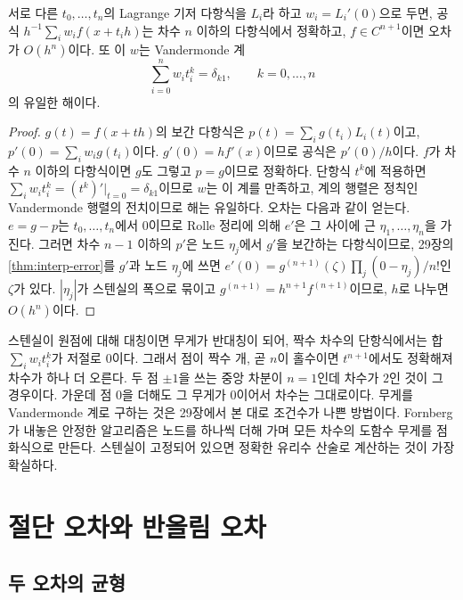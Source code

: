\begin{proposition}
\label{prop:fd-weights}
서로 다른 $t_0,\dots,t_n$의 Lagrange 기저 다항식을 $L_i$라 하고 $w_i=L_i'(0)$으로 두면, 공식 $h^{-1}\sum_iw_if(x+t_ih)$는 차수 $n$ 이하의 다항식에서 정확하고, $f\in C^{n+1}$이면 오차가 $O(h^n)$이다. 또 이 $w$는 Vandermonde 계
\[
\sum_{i=0}^nw_it_i^k=\delta_{k1},\qquad k=0,\dots,n
\]
의 유일한 해이다.
\end{proposition}

\begin{proof}
$g(t)=f(x+th)$의 보간 다항식은 $p(t)=\sum_ig(t_i)L_i(t)$이고, $p'(0)=\sum_iw_ig(t_i)$이다. $g'(0)=hf'(x)$이므로 공식은 $p'(0)/h$이다. $f$가 차수 $n$ 이하의 다항식이면 $g$도 그렇고 $p=g$이므로 정확하다. 단항식 $t^k$에 적용하면 $\sum_iw_it_i^k=(t^k)'\big|_{t=0}=\delta_{k1}$이므로 $w$는 이 계를 만족하고, 계의 행렬은 정칙인 Vandermonde 행렬의 전치이므로 해는 유일하다. 오차는 다음과 같이 얻는다. $e=g-p$는 $t_0,\dots,t_n$에서 $0$이므로 Rolle 정리에 의해 $e'$은 그 사이에 근 $\eta_1,\dots,\eta_n$을 가진다. 그러면 차수 $n-1$ 이하의 $p'$은 노드 $\eta_j$에서 $g'$을 보간하는 다항식이므로, 29장의 \cref{thm:interp-error}를 $g'$과 노드 $\eta_j$에 쓰면 $e'(0)=g^{(n+1)}(\zeta)\prod_j(0-\eta_j)/n!$인 $\zeta$가 있다. $|\eta_j|$가 스텐실의 폭으로 묶이고 $g^{(n+1)}=h^{n+1}f^{(n+1)}$이므로, $h$로 나누면 $O(h^n)$이다.
\end{proof}

스텐실이 원점에 대해 대칭이면 무게가 반대칭이 되어, 짝수 차수의 단항식에서는 합 $\sum_iw_it_i^k$가 저절로 $0$이다. 그래서 점이 짝수 개, 곧 $n$이 홀수이면 $t^{n+1}$에서도 정확해져 차수가 하나 더 오른다. 두 점 $\pm1$을 쓰는 중앙 차분이 $n=1$인데 차수가 $2$인 것이 그 경우이다. 가운데 점 $0$을 더해도 그 무게가 $0$이어서 차수는 그대로이다. 무게를 Vandermonde 계로 구하는 것은 29장에서 본 대로 조건수가 나쁜 방법이다. Fornberg가 내놓은 안정한 알고리즘은 노드를 하나씩 더해 가며 모든 차수의 도함수 무게를 점화식으로 만든다\cite{fornberg1988}. 스텐실이 고정되어 있으면 정확한 유리수 산술로 계산하는 것이 가장 확실하다.

\section{절단 오차와 반올림 오차}
\label{sec:fd-rounding}

\subsection{두 오차의 균형}

